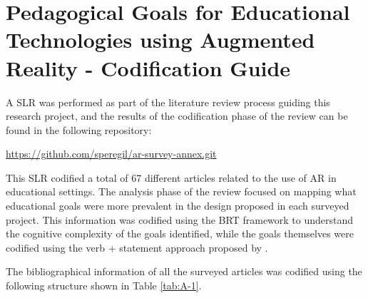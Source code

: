 \chapter{Pedagogical Goals for Educational Technologies using Augmented Reality - Codification Guide \label{appendix:a}}

A \ac{SLR} was performed as part of the literature review process guiding this research project, and the results of the codification phase of the review can be found in the following
repository:

\url{https://github.com/speregil/ar-survey-annex.git}

This \ac{SLR} codified a total of 67 different articles related to the use of \ac{AR} in educational settings. The analysis phase of the review focused on mapping what educational goals
were more prevalent in the design proposed in each surveyed project. This information was codified using the \ac{BRT} framework to understand the cognitive complexity of the goals
identified, while the goals themselves were codified using the verb + statement approach proposed by \textcite{fuchs_1982}.

The bibliographical information of all the surveyed articles was codified using the following structure shown in Table \ref{tab:A-1}.


